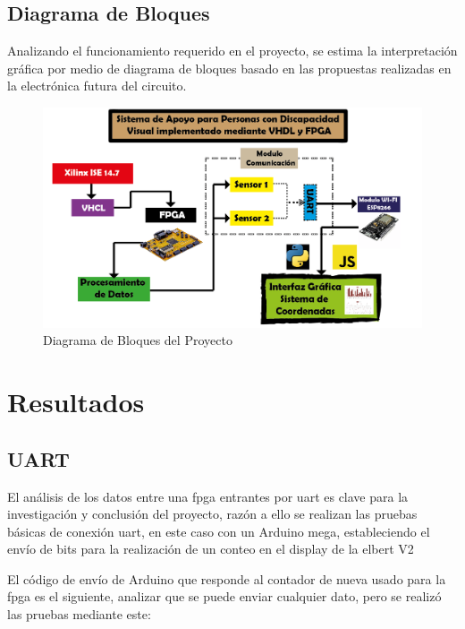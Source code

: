 \documentclass[journal]{IEEEtran}
\begin{document}
\subsection{Diagrama de Bloques}

Analizando el funcionamiento requerido en el proyecto, se estima la interpretación gráfica por medio de diagrama de bloques basado en las propuestas realizadas en la electrónica futura del circuito. 

\begin{figure}[H]
    \centering
        \includegraphics[scale=0.29]{images/Mapa de flujo.png}
    \caption{Diagrama de Bloques del Proyecto}
    \label{fig:my_label}
\end{figure}


\section{Resultados}

\subsection{UART}

El análisis de los datos entre una fpga entrantes por uart es clave para la investigación y conclusión del proyecto, razón a ello se realizan las pruebas básicas de conexión uart, en este caso con un Arduino mega, estableciendo el envío de bits para la realización de un conteo en el display de la elbert V2 

El código de envío de Arduino que responde al contador de nueva usado para la fpga es el siguiente, analizar que se puede enviar cualquier dato, pero se realizó las pruebas mediante este:
\end{document}

